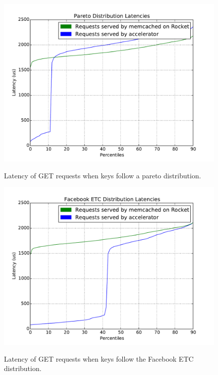 \begin{figure}[t]
\begin{center}
\label{fig:pareto}
\includegraphics[width=\linewidth]{pareto.pdf}
\caption{Latency of GET requests when keys follow a pareto distribution.}
\end{center}
\end{figure}

\begin{figure}[t]
\begin{center}
\label{fig:etc}
\includegraphics[width=\linewidth]{etc.pdf}
\caption{Latency of GET requests when keys follow the Facebook ETC distribution.}
\end{center}
\end{figure}

